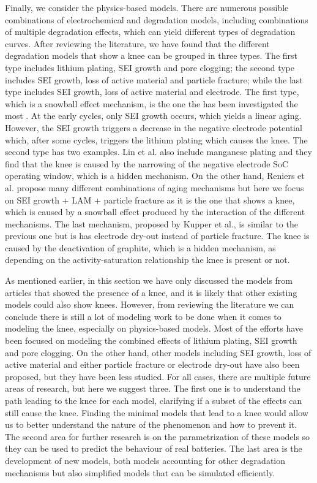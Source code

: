 \documentclass[journal=jpclcd,manuscript=article]{achemso}
\begin{document}
Finally, we consider the physics-based models. There are numerous possible combinations of electrochemical and degradation models, including combinations of multiple degradation effects, which can yield different types of degradation curves.\cite{reniers_review_2019} After reviewing the literature, we have found that the different degradation models that show a knee can be grouped in three types. The first type includes lithium plating, SEI growth and pore clogging; the second type includes SEI growth, loss of active material and particle fracture; while the last type includes SEI growth, loss of active material and electrode. The first type, which is a snowball effect mechanism, is the one the has been investigated the most \cite{yang_modeling_2017,yang_understanding_2018,muller_model-based_2019,atalay_theory_2020,keil_electrochemical_2020}. At the early cycles, only SEI growth occurs, which yields a linear aging. However, the SEI growth triggers a decrease in the negative electrode potential which, after some cycles, triggers the lithium plating which causes the knee. The second type has two examples. Lin et al. \cite{lin_comprehensive_2013} also include manganese plating and they find that the knee is caused by the narrowing of the negative electrode SoC operating window, which is a hidden mechanism. On the other hand, Reniers et al. \cite{reniers_review_2019} propose many different combinations of aging mechanisms but here we focus on SEI growth + LAM + particle fracture as it is the one that shows a knee, which is caused by a snowball effect produced by the interaction of the different mechanisms. The last mechanism, proposed by Kupper et al.,\cite{kupper_end--life_2018}  is similar to the previous one but is has electrode dry-out instead of particle fracture. The knee is caused by the deactivation of graphite, which is a hidden mechanism, as depending on the activity-saturation relationship the knee is present or not.

As mentioned earlier, in this section we have only discussed the models from articles that showed the presence of a knee, and it is likely that other existing models could also show knees. However, from reviewing the literature we can conclude there is still a lot of modeling work to be done when it comes to modeling the knee, especially on physics-based models. Most of the efforts have been focused on modeling the combined effects of lithium plating, SEI growth and pore clogging. On the other hand, other models including SEI growth, loss of active material and either particle fracture or electrode dry-out have also been proposed, but they have been less studied. For all cases, there are multiple future areas of research, but here we suggest three. The first one is to understand the path leading to the knee for each model, clarifying if a subset of the effects can still cause the knee. Finding the minimal models that lead to a knee would allow us to better understand the nature of the phenomenon and how to prevent it. The second area for further research is on the parametrization of these models so they can be used to predict the behaviour of real batteries. The last area is the development of new models, both models accounting for other degradation mechanisms but also simplified models that can be simulated efficiently.
\end{document}
